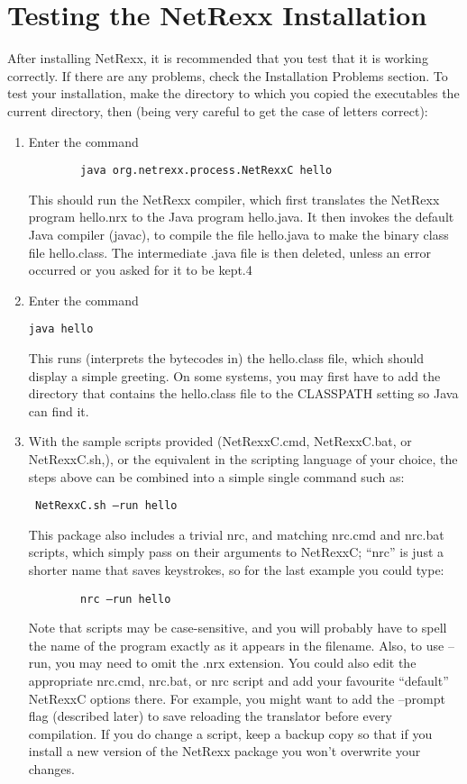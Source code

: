 \section{Testing the NetRexx Installation}
After installing NetRexx, it is recommended that you test that it is working correctly. If there are any problems, check the Installation Problems section. 
To test your installation, make the directory to which you copied the executables the current directory, then (being very careful to get the case of letters correct):
\begin{enumerate}
\item Enter the command
 \begin{verbatim}
        java org.netrexx.process.NetRexxC hello
\end{verbatim}
This should run the NetRexx compiler, which first translates the NetRexx program hello.nrx to the Java program hello.java. It then invokes the default Java compiler (javac), to compile the file hello.java to make the binary class file hello.class. The intermediate .java file is then deleted, unless an error occurred or you asked for it to be kept.4 
\item Enter the command
 \begin{verbatim} 
java hello 
\end{verbatim}
This runs (interprets the bytecodes in) the hello.class file, which should display a simple greeting. On some systems, you may first have to add the directory that contains the hello.class file to the CLASSPATH setting so Java can find it. 
\item With the sample scripts provided (NetRexxC.cmd, NetRexxC.bat, or NetRexxC.sh,), or the equivalent in the scripting language of your choice, the steps above can be combined into a simple single command such as:
  \begin{verbatim}
 NetRexxC.sh –run hello
\end{verbatim}
This package also includes a trivial nrc, and matching nrc.cmd and nrc.bat scripts, which simply pass on their arguments to NetRexxC; “nrc” is just a shorter name that saves keystrokes, so for the last example you could type: 
  \begin{verbatim}
        nrc –run hello
\end{verbatim}
Note that scripts may be case-sensitive, and you will probably have to spell the name of the program exactly as it appears in the filename. Also, to use –run, you may need to omit the .nrx extension. 
You could also edit the appropriate nrc.cmd, nrc.bat, or nrc script and add your favourite “default” NetRexxC options there. For example, you might want to add the –prompt flag (described later) to save reloading the translator before every compilation. If you do change a script, keep a backup copy so that if you install a new version of the NetRexx package you won’t overwrite your changes. 
\end{enumerate}